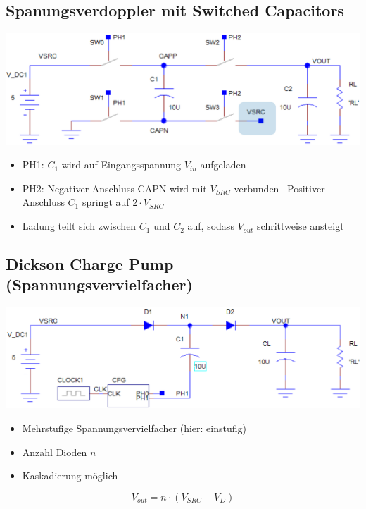 \subsection{Spanungsverdoppler mit Switched Capacitors}

\begin{center}
    \includegraphics[width=0.75\columnwidth]{images/spannungsverdoppler.png}
\end{center}

\begin{itemize}
    \item PH1: $C_1$ wird auf Eingangsspannung $V_{in}$ aufgeladen
    \item PH2: Negativer Anschluss CAPN wird mit $V_{SRC}$ verbunden \textrightarrow\ Positiver Anschluss $C_1$ springt auf $2 \cdot V_{SRC} $
    \item Ladung teilt sich zwischen $C_1$ und $C_2$ auf, sodass $V_{out}$ schrittweise ansteigt 
\end{itemize}


\subsection{Dickson Charge Pump (Spannungsvervielfacher)}

\begin{minipage}[c]{0.55\columnwidth}
    \includegraphics[width=\columnwidth]{images/dickson_charge_pump.png}
\end{minipage}
\hfill
\begin{minipage}[c]{0.43\columnwidth}
    \begin{itemize}
        \item Mehrstufige Spannungsvervielfacher (hier: einstufig)
        \item Anzahl Dioden $n$ 
        \item Kaskadierung möglich
    \end{itemize}
    $$ \boxed{ V_{out} = n \cdot (V_{SRC} - V_D) } $$
\end{minipage}


